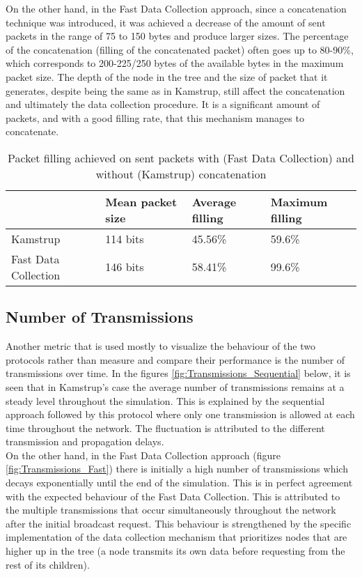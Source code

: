 On the other hand, in the Fast Data Collection approach, since a concatenation technique was introduced, it was achieved a decrease of the amount of sent packets in the range of 75 to 150 bytes and produce larger sizes. The percentage of the concatenation (filling of the concatenated packet) often goes up to 80-90\%, which corresponds to 200-225/250 bytes of the available bytes in the maximum packet size. The depth of the node in the tree and the size of packet that it generates, despite being the same as in Kamstrup, still affect the concatenation and ultimately the data collection procedure. It is a significant amount of packets, and with a good filling rate, that this mechanism manages to concatenate.

\begin{table}[H]
\begin{center}
    \begin{tabular}{ | l | l | l | l |}
    \hline
    & Mean packet size & Average filling & Maximum filling \\ \hline
    Kamstrup & 114 bits & 45.56\% & 59.6\% \\ \hline
    Fast Data Collection & 146 bits & 58.41\% & 99.6\% \\ \hline
    \end{tabular}
\end{center}
\caption{Packet filling achieved on sent packets with (Fast Data Collection) and without (Kamstrup) concatenation}
\label{tab:packet_filling}
\end{table}

\subsection{Number of Transmissions}
Another metric that is used mostly to visualize the behaviour of the two protocols rather than measure and compare their performance is the number of transmissions over time. In the figures \ref{fig:Transmissions_Sequential}  below, it is seen that in Kamstrup's case the average number of transmissions remains at a steady level throughout the simulation. This is explained by the sequential approach followed by this protocol where only one transmission is allowed at each time throughout the network. The fluctuation is attributed to the different transmission and propagation delays.\\
On the other hand, in the Fast Data Collection approach (figure \ref{fig:Transmissions_Fast}) there is initially a high number of transmissions which decays exponentially until the end of the simulation. This is in perfect agreement with the expected behaviour of the Fast Data Collection. This is attributed to the multiple transmissions that occur simultaneously throughout the network after the initial broadcast request. This behaviour is strengthened by the specific implementation of the data collection mechanism that prioritizes nodes that are higher up in the tree (a node transmits its own data before requesting from the rest of its children).

